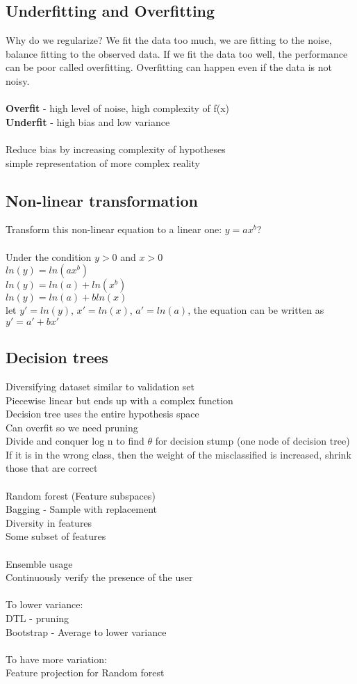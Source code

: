 \documentclass[11pt]{article}
\begin{document}
\subsection*{Underfitting and Overfitting}
Why do we regularize?
We fit the data too much, we are fitting to the noise, balance fitting to the observed data. If we fit the data too well, the performance can be poor called overfitting. Overfitting can happen even if the data is not noisy.\\\\
\textbf{Overfit} - high level of noise, high complexity of f(x)\\
\textbf{Underfit} - high bias and low variance\\\\
Reduce bias by increasing complexity of hypotheses\\
simple representation of more complex reality
\subsection*{Non-linear transformation}
Transform this non-linear equation to a linear one: $y = ax^b$?
\\\\
 Under the condition $y>0$ and $x>0$
 \\
$ln(y)=ln(ax^b)$
\\
$ln(y)=ln(a)+ln(x^b)$
\\
$ln(y)=ln(a)+bln(x)$
\\
let $y'=ln(y)$, $x'=ln(x)$, $a'=ln(a)$, the equation can be written as $y'=a'+bx'$
\subsection*{Decision trees}
Diversifying dataset similar to validation set\\
Piecewise linear but ends up with a complex function\\
Decision tree uses the entire hypothesis space\\
Can overfit so we need pruning
\\
Divide and conquer log n to find $\theta$ for decision stump (one node of decision tree)
\\
If it is in the wrong class, then the weight of the misclassified is increased, shrink those that are correct\\\\
Random forest (Feature subspaces) \\
Bagging - Sample with replacement\\
Diversity in features\\
Some subset of features\\
\\
Ensemble usage\\
Continuously verify the presence of the user
\\\\
To lower variance: \\
DTL - pruning\\
Bootstrap - Average to lower variance\\
\\
To have more variation: \\
Feature projection for Random forest
\end{document}
